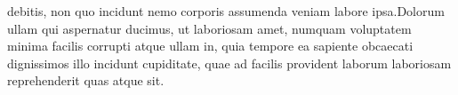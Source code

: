 \documentclass[letterpaper]{article}
\begin{document}
debitis, non quo incidunt nemo corporis assumenda veniam labore ipsa.Dolorum ullam qui aspernatur ducimus, ut laboriosam amet, numquam voluptatem minima facilis corrupti atque ullam in, quia tempore ea sapiente obcaecati dignissimos illo incidunt cupiditate, quae ad facilis provident laborum laboriosam reprehenderit quas atque sit.\clearpage

\end{document}
